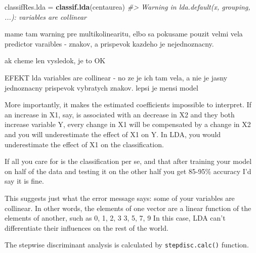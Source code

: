 \documentclass[
]{article}
\newenvironment{Shaded}{\begin{snugshade}}{\end{snugshade}}
\newcommand{\CommentTok}[1]{\textcolor[rgb]{0.56,0.35,0.01}{\textit{#1}}}
\newcommand{\KeywordTok}[1]{\textcolor[rgb]{0.13,0.29,0.53}{\textbf{#1}}}
\newcommand{\NormalTok}[1]{#1}
\newcommand{\StringTok}[1]{\textcolor[rgb]{0.31,0.60,0.02}{#1}}
\begin{document}
\begin{Shaded}
\begin{Highlighting}[]
\NormalTok{classifRes.lda =}\StringTok{ }\KeywordTok{classif.lda}\NormalTok{(centaurea)}
\CommentTok{#> Warning in lda.default(x, grouping, ...): variables are collinear}
\end{Highlighting}
\end{Shaded}

mame tam warning pre multikolinearitu, elbo sa pokusame pouzit velmi
vela predictor varaibles - znakov, a prispevok kazdeho je nejednoznacny.

ak cheme len vysledok, je to OK

EFEKT lda variables are collinear - no ze je ich tam vela, a nie je
jasny jednoznacny prispevok vybratych znakov. lepsi je mensi model

More importantly, it makes the estimated coefficients impossible to
interpret. If an increase in X1, say, is associated with an decrease in
X2 and they both increase variable Y, every change in X1 will be
compensated by a change in X2 and you will underestimate the effect of
X1 on Y. In LDA, you would underestimate the effect of X1 on the
classification.

If all you care for is the classification per se, and that after
training your model on half of the data and testing it on the other half
you get 85-95\% accuracy I'd say it is fine.

This suggests just what the error message says: some of your variables
are collinear. In other words, the elements of one vector are a linear
function of the elements of another, such as 0, 1, 2, 3 3, 5, 7, 9 In
this case, LDA can't differentiate their influences on the rest of the
world.

The stepwise discriminant analysis is calculated by
\texttt{stepdisc.calc()} function.
\end{document}
